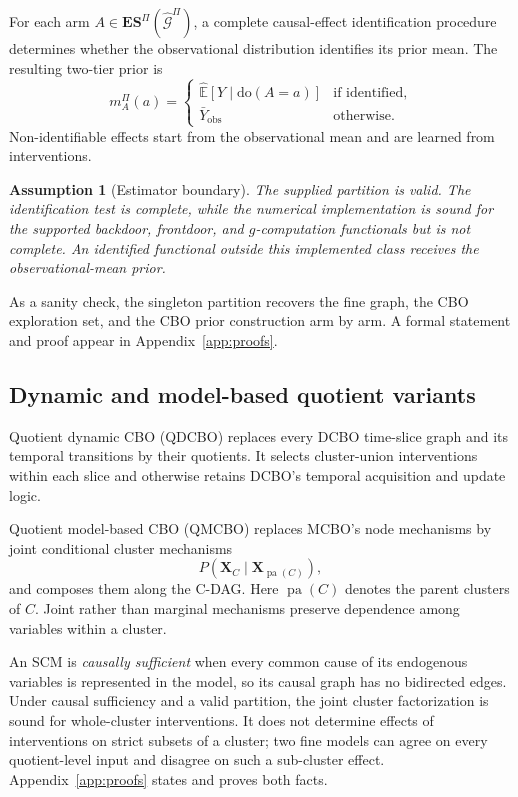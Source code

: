 \documentclass[twoside]{article}
\newtheorem{assumption}{Assumption}
\newcommand{\E}{\mathbb{E}}
\newcommand{\doo}{\mathrm{do}}
\newcommand{\QDCBO}{\textsc{QDCBO}}
\newcommand{\QMCBO}{\textsc{QMCBO}}
\newcommand{\Gg}{\mathcal{G}}
\newcommand{\ESpi}{\mathbf{ES}^{\Pi}}
\begin{document}
For each arm \(A\in\ESpi(\widehat{\Gg}^{\Pi})\), a complete causal-effect identification procedure determines whether the observational distribution identifies its prior mean. The resulting two-tier prior is
\begin{equation}
 m_A^\Pi(a)=
 \begin{cases}
  \widehat{\E}[Y\mid\doo(A=a)] & \text{if identified},\\
  \bar Y_{\mathrm{obs}} & \text{otherwise.}
 \end{cases}
 \label{eq:two-tier-prior}
\end{equation}
Non-identifiable effects start from the observational mean and are learned from interventions.

\begin{assumption}[Estimator boundary]
The supplied partition is valid. The identification test is complete, while the numerical implementation is sound for the supported backdoor, frontdoor, and \(g\)-computation functionals but is not complete. An identified functional outside this implemented class receives the observational-mean prior.
\end{assumption}

As a sanity check, the singleton partition recovers the fine graph, the CBO exploration set, and the CBO prior construction arm by arm. A formal statement and proof appear in Appendix~\ref{app:proofs}.

\subsection{Dynamic and model-based quotient variants}

Quotient dynamic CBO (\QDCBO{}) replaces every DCBO time-slice graph and its temporal transitions by their quotients. It selects cluster-union interventions within each slice and otherwise retains DCBO's temporal acquisition and update logic.

Quotient model-based CBO (\QMCBO{}) replaces MCBO's node mechanisms by joint conditional cluster mechanisms
\[
 P(\mathbf X_C\mid\mathbf X_{\operatorname{pa}(C)}),
\]
and composes them along the C-DAG. Here \(\operatorname{pa}(C)\) denotes the parent clusters of \(C\). Joint rather than marginal mechanisms preserve dependence among variables within a cluster.

An SCM is \emph{causally sufficient} when every common cause of its endogenous variables is represented in the model, so its causal graph has no bidirected edges. Under causal sufficiency and a valid partition, the joint cluster factorization is sound for whole-cluster interventions. It does not determine effects of interventions on strict subsets of a cluster; two fine models can agree on every quotient-level input and disagree on such a sub-cluster effect. Appendix~\ref{app:proofs} states and proves both facts.
\end{document}
